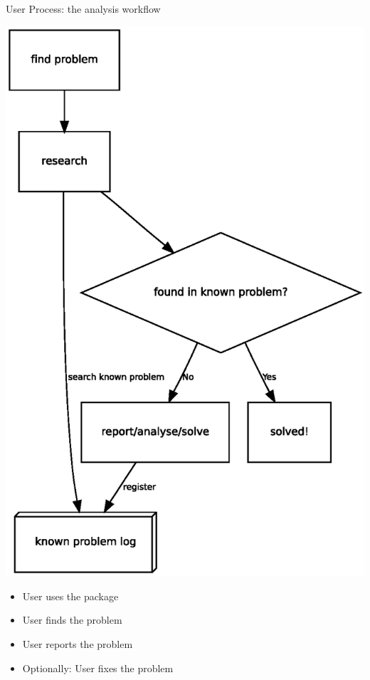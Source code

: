 \documentclass[cjk,dvipdfm,12pt]{beamer}
\begin{document}
\begin{frame}{User Process: the analysis workflow}
\begin{minipage}{0.40\hsize}
 \includegraphics[width=1\hsize]{image200805/problemcycle-en.eps}
\end{minipage}
\begin{minipage}{0.5\hsize}
 \begin{itemize}
  \item User uses the package
  \item User finds the problem
  \item User reports the problem
  \item Optionally: User fixes the problem
 \end{itemize}
\end{minipage}
\end{frame}
\end{document}

